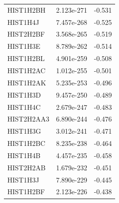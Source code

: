 \documentclass[a4paper,12pt]{article}
\begin{document}
{\begin{longtable}{lcc}
    HIST1H2BH  & 2.123e-271 & -0.531                                                                                        \\
    HIST1H4J   & 7.457e-268 & -0.525                                                                                        \\
    HIST2H2BF  & 3.568e-265 & -0.519                                                                                        \\
    HIST1H3E   & 8.789e-262 & -0.514                                                                                        \\
    HIST1H2BL  & 4.901e-259 & -0.508                                                                                        \\
    HIST1H2AC  & 1.012e-255 & -0.501                                                                                        \\
    HIST1H2AK  & 5.235e-253 & -0.496                                                                                        \\
    HIST1H3D   & 9.457e-250 & -0.489                                                                                        \\
    HIST1H4C   & 2.679e-247 & -0.483                                                                                        \\
    HIST2H2AA3 & 6.890e-244 & -0.476                                                                                        \\
    HIST1H3G   & 3.012e-241 & -0.471                                                                                        \\
    HIST1H2BC  & 8.235e-238 & -0.464                                                                                        \\
    HIST1H4B   & 4.457e-235 & -0.458                                                                                        \\
    HIST2H2AB  & 1.679e-232 & -0.451                                                                                        \\
    HIST1H3J   & 7.890e-229 & -0.445                                                                                        \\
    HIST1H2BF  & 2.123e-226 & -0.438                                                                                        \\

\end{longtable}}
\end{document}
